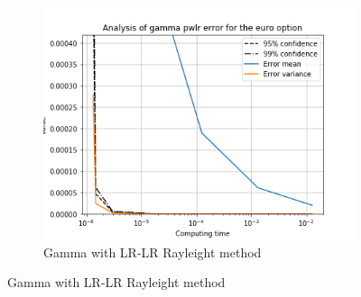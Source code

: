 \documentclass[11pt,a4paper,fleqn]{article}
\begin{document}
\begin{figure}[h!]
\begin{subfigure}[b]{0.3\textwidth}
          \includegraphics[width=\textwidth]{graphs/eurogammapwlrtime.png}
          \caption{Gamma with LR-LR Rayleight method}
      \end{subfigure}


\end{figure}
\end{document}
